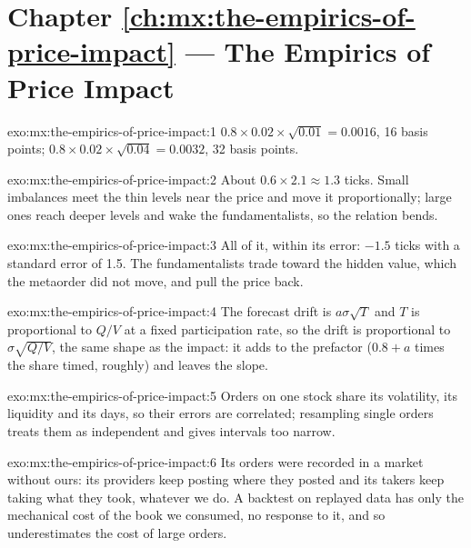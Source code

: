 \section*{Chapter \ref{ch:mx:the-empirics-of-price-impact} --- The Empirics of Price Impact}

\begin{solution}{exo:mx:the-empirics-of-price-impact:1}
$0.8\times0.02\times\sqrt{0.01}=0.0016$, 16 basis points; $0.8\times0.02\times\sqrt{0.04}=0.0032$, 32 basis points.
\end{solution}

\begin{solution}{exo:mx:the-empirics-of-price-impact:2}
About $0.6\times2.1\approx1.3$ ticks. Small imbalances meet the thin levels near the price and move it proportionally; large ones reach deeper levels and
wake the fundamentalists, so the relation bends.
\end{solution}

\begin{solution}{exo:mx:the-empirics-of-price-impact:3}
All of it, within its error: $-1.5$ ticks with a standard error of 1.5. The fundamentalists trade toward the hidden value, which the metaorder did not
move, and pull the price back.
\end{solution}

\begin{solution}{exo:mx:the-empirics-of-price-impact:4}
The forecast drift is $a\sigma\sqrt T$ and $T$ is proportional to $Q/V$ at a fixed participation rate, so the drift is proportional to $\sigma\sqrt{Q/V}$,
the same shape as the impact: it adds to the prefactor ($0.8+a$ times the share timed, roughly) and leaves the slope.
\end{solution}

\begin{solution}{exo:mx:the-empirics-of-price-impact:5}
Orders on one stock share its volatility, its liquidity and its days, so their errors are correlated; resampling single orders treats them as independent
and gives intervals too narrow.
\end{solution}

\begin{solution}{exo:mx:the-empirics-of-price-impact:6}
Its orders were recorded in a market without ours: its providers keep posting where they posted and its takers keep taking what they took, whatever we
do. A backtest on replayed data has only the mechanical cost of the book we consumed, no response to it, and so underestimates the cost of large orders.
\end{solution}

